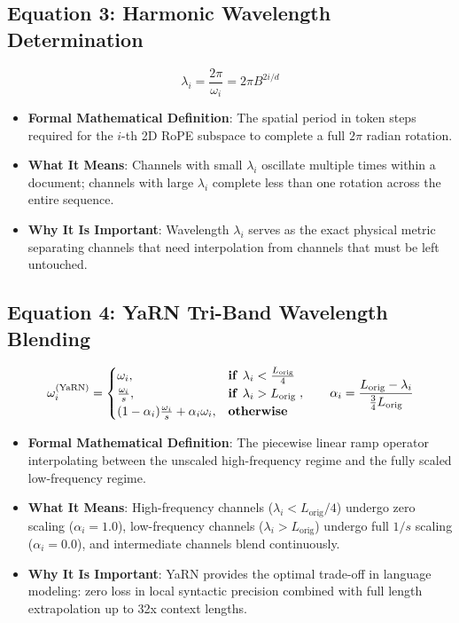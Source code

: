 \documentclass[11pt,a4paper]{article}
\theoremstyle{definition}
\begin{document}
\subsection{\textbf{Equation 3: Harmonic Wavelength Determination}}
{\boldmath
\begin{equation}
\lambda_i = \frac{2\pi}{\omega_i} = 2\pi B^{2i / d}
\end{equation}
}
\begin{itemize}
    \item \textbf{Formal Mathematical Definition}:
    The spatial period in token steps required for the $i$-th 2D RoPE subspace to complete a full $2\pi$ radian rotation.
    \item \textbf{What It Means}:
    Channels with small $\lambda_i$ oscillate multiple times within a document; channels with large $\lambda_i$ complete less than one rotation across the entire sequence.
    \item \textbf{Why It Is Important}:
    Wavelength $\lambda_i$ serves as the exact physical metric separating channels that need interpolation from channels that must be left untouched.
\end{itemize}

\subsection{\textbf{Equation 4: YaRN Tri-Band Wavelength Blending}}
{\boldmath
\begin{equation}
\omega_i^{(\text{YaRN})} = \begin{cases} \omega_i, & \text{\textbf{if }} \lambda_i < \frac{L_{\text{orig}}}{4} \\ \frac{\omega_i}{s}, & \text{\textbf{if }} \lambda_i > L_{\text{orig}} \\ (1 - \alpha_i) \frac{\omega_i}{s} + \alpha_i \omega_i, & \text{\textbf{otherwise}} \end{cases}, \qquad \alpha_i = \frac{L_{\text{orig}} - \lambda_i}{\frac{3}{4} L_{\text{orig}}}
\end{equation}
}
\begin{itemize}
    \item \textbf{Formal Mathematical Definition}:
    The piecewise linear ramp operator interpolating between the unscaled high-frequency regime and the fully scaled low-frequency regime.
    \item \textbf{What It Means}:
    High-frequency channels ($\lambda_i < L_{\text{orig}}/4$) undergo zero scaling ($\alpha_i = 1.0$), low-frequency channels ($\lambda_i > L_{\text{orig}}$) undergo full $1/s$ scaling ($\alpha_i = 0.0$), and intermediate channels blend continuously.
    \item \textbf{Why It Is Important}:
    YaRN provides the optimal trade-off in language modeling: zero loss in local syntactic precision combined with full length extrapolation up to 32x context lengths.
\end{itemize}
\end{document}
